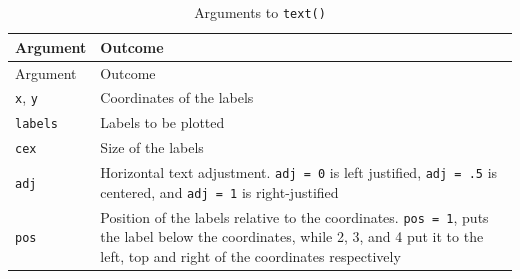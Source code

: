 \documentclass[]{book}
\theoremstyle{definition}
\theoremstyle{definition}
\theoremstyle{remark}
\begin{document}
\begin{longtable}[]{@{}ll@{}}
\caption{\label{tab:textarguments} Arguments to
\texttt{text()}}\tabularnewline
\toprule
\begin{minipage}[b]{0.14\columnwidth}\raggedright\strut
Argument\strut
\end{minipage} & \begin{minipage}[b]{0.71\columnwidth}\raggedright\strut
Outcome\strut
\end{minipage}\tabularnewline
\midrule
\endfirsthead
\toprule
\begin{minipage}[b]{0.14\columnwidth}\raggedright\strut
Argument\strut
\end{minipage} & \begin{minipage}[b]{0.71\columnwidth}\raggedright\strut
Outcome\strut
\end{minipage}\tabularnewline
\midrule
\endhead
\begin{minipage}[t]{0.14\columnwidth}\raggedright\strut
\texttt{x}, \texttt{y}\strut
\end{minipage} & \begin{minipage}[t]{0.71\columnwidth}\raggedright\strut
Coordinates of the labels\strut
\end{minipage}\tabularnewline
\begin{minipage}[t]{0.14\columnwidth}\raggedright\strut
\texttt{labels}\strut
\end{minipage} & \begin{minipage}[t]{0.71\columnwidth}\raggedright\strut
Labels to be plotted\strut
\end{minipage}\tabularnewline
\begin{minipage}[t]{0.14\columnwidth}\raggedright\strut
\texttt{cex}\strut
\end{minipage} & \begin{minipage}[t]{0.71\columnwidth}\raggedright\strut
Size of the labels\strut
\end{minipage}\tabularnewline
\begin{minipage}[t]{0.14\columnwidth}\raggedright\strut
\texttt{adj}\strut
\end{minipage} & \begin{minipage}[t]{0.71\columnwidth}\raggedright\strut
Horizontal text adjustment. \texttt{adj\ =\ 0} is left justified,
\texttt{adj\ =\ .5} is centered, and \texttt{adj\ =\ 1} is
right-justified\strut
\end{minipage}\tabularnewline
\begin{minipage}[t]{0.14\columnwidth}\raggedright\strut
\texttt{pos}\strut
\end{minipage} & \begin{minipage}[t]{0.71\columnwidth}\raggedright\strut
Position of the labels relative to the coordinates. \texttt{pos\ =\ 1},
puts the label below the coordinates, while 2, 3, and 4 put it to the
left, top and right of the coordinates respectively\strut
\end{minipage}\tabularnewline
\bottomrule
\end{longtable}
\end{document}
